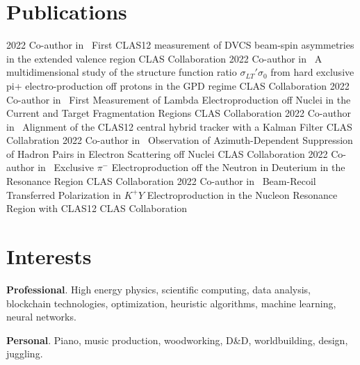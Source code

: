 \documentclass[a4paper]{cv-style}
\begin{document}
\section{Publications}
    \begin{entrylist}
        \entry
            {2022}
            {{\normalfont Co-author in} ~First CLAS12 measurement of DVCS beam-spin asymmetries in the extended valence region}
            {CLAS Collaboration}
            {\vspace{-0.3cm}}
        \entry
            {2022}
            {{\normalfont Co-author in} ~A multidimensional study of the structure function ratio $\sigma_{LT}'\sigma_0$ from hard exclusive pi+ electro-production off protons in the GPD regime}
            {CLAS Collaboration}
            {\vspace{-0.3cm}}
        \entry
            {2022}
            {{\normalfont Co-author in} ~First Measurement of Lambda Electroproduction off Nuclei in the Current and Target Fragmentation Regions}
            {CLAS Collaboration}
            {\vspace{-0.3cm}}
        \entry
            {2022}
            {{\normalfont Co-author in} ~Alignment of the CLAS12 central hybrid tracker with a Kalman Filter \hspace{1.5cm}}
            {CLAS Collabration}
            {\vspace{-0.3cm}}
        \entry
            {2022}
            {{\normalfont Co-author in} ~Observation of Azimuth-Dependent Suppression of Hadron Pairs in Electron Scattering off Nuclei}
            {CLAS Collaboration}
            {\vspace{-0.3cm}}
        \entry
            {2022}
            {{\normalfont Co-author in} ~Exclusive $\pi^-$ Electroproduction off the Neutron in Deuterium in the Resonance Region}
            {CLAS Collaboration}
            {\vspace{-0.3cm}}
        \entry
            {2022}
            {{\normalfont Co-author in} ~Beam-Recoil Transferred Polarization in $K^+Y$ Electroproduction in the Nucleon Resonance Region with CLAS12}
            {CLAS Collaboration}
            {\vspace{-0.3cm}}
    \end{entrylist}

\section{Interests}
    \vspace{-0.2cm}

    \textbf{Professional}. High energy physics, scientific computing, data analysis, blockchain technologies, optimization, heuristic algorithms, machine learning, neural networks.

    \textbf{Personal}. Piano, music production, woodworking, D\&D, worldbuilding, design, juggling.

\end{document}
